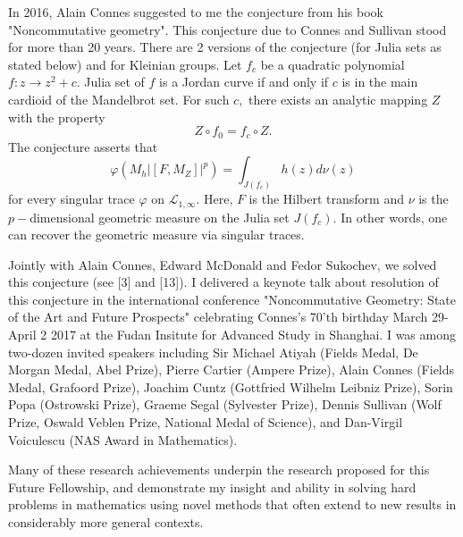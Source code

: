 \documentclass[12pt]{article}
\begin{document}
In 2016, Alain Connes suggested to me the conjecture from his book "Noncommutative geometry". This conjecture due to Connes and Sullivan stood for more than 20 years. There are 2 versions of the conjecture (for Julia sets as stated below) and for Kleinian groups. Let $f_c$ be a quadratic polynomial $f:z\to z^2+c.$ Julia set of $f$ is a Jordan curve if and only if $c$ is in the main cardioid of the Mandelbrot set. For such $c,$ there exists an analytic mapping $Z$ with the property
$$Z\circ f_0=f_c\circ Z.$$
The conjecture asserts that
$$\varphi(M_h|[F,M_Z]|^p)=\int_{J(f_c)}h(z)d\nu(z)$$
for every singular trace $\varphi$ on $\mathcal{L}_{1,\infty}.$ Here, $F$ is the Hilbert transform and $\nu$ is the $p-$dimensional geometric measure on the Julia set $J(f_c).$ In other words, one can recover the geometric measure via singular traces.

Jointly with Alain Connes, Edward McDonald and Fedor Sukochev, we solved this conjecture (see [3] and [13]). I delivered a keynote talk about resolution of this conjecture in the international conference "Noncommutative Geometry: State of the Art and Future Prospects" celebrating Connes's 70'th birthday March 29-April 2 2017 at the Fudan Insitute for Advanced Study in Shanghai. I was among two-dozen invited speakers including Sir Michael Atiyah (Fields Medal, De Morgan Medal, Abel Prize), Pierre Cartier (Ampere Prize), Alain Connes (Fields Medal, Grafoord Prize), Joachim Cuntz (Gottfried Wilhelm Leibniz Prize), Sorin Popa (Ostrowski Prize), Graeme Segal (Sylvester Prize), Dennis Sullivan (Wolf Prize, Oswald Veblen Prize, National Medal of Science), and Dan-Virgil Voiculescu (NAS Award in Mathematics).

Many of these research achievements underpin the research proposed for this Future Fellowship, and demonstrate my insight and ability in solving hard problems in mathematics using novel methods that often extend to new results in considerably more general contexts.
\end{document}
